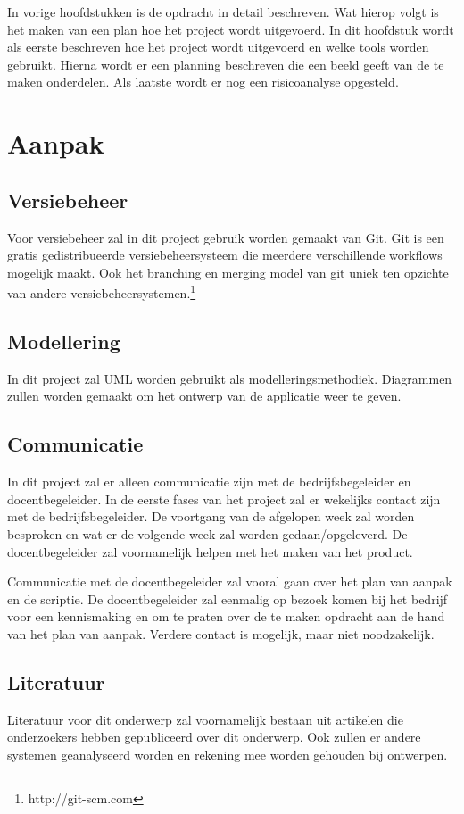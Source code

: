 
In vorige hoofdstukken is de opdracht in detail beschreven. Wat hierop volgt is het maken van een plan hoe het project wordt uitgevoerd. In dit hoofdstuk wordt als eerste beschreven hoe het project wordt uitgevoerd en welke tools worden gebruikt. Hierna wordt er een planning beschreven die een beeld geeft van de te maken onderdelen. Als laatste wordt er nog een risicoanalyse opgesteld.

\section{Aanpak}

\subsection{Versiebeheer}
Voor versiebeheer zal in dit project gebruik worden gemaakt van Git. Git is een gratis gedistribueerde versiebeheersysteem die meerdere verschillende workflows mogelijk maakt. Ook het branching en merging model van git uniek ten opzichte van andere versiebeheersystemen.\footnote{http://git-scm.com}

\subsection{Modellering}
In dit project zal UML worden gebruikt als modelleringsmethodiek. Diagrammen zullen worden gemaakt om het ontwerp van de applicatie weer te geven.

\subsection{Communicatie}
In dit project zal er alleen communicatie zijn met de bedrijfsbegeleider en docentbegeleider. In de eerste fases van het project zal er wekelijks contact zijn met de bedrijfsbegeleider. De voortgang van de afgelopen week zal worden besproken en wat er de volgende week zal worden gedaan/opgeleverd. De docentbegeleider zal voornamelijk helpen met het maken van het product.

Communicatie met de docentbegeleider zal vooral gaan over het plan van aanpak en de scriptie. De docentbegeleider zal eenmalig op bezoek komen bij het bedrijf voor een kennismaking en om te praten over de te maken opdracht aan de hand van het plan van aanpak. Verdere contact is mogelijk, maar niet noodzakelijk.

\subsection{Literatuur}
Literatuur voor dit onderwerp zal voornamelijk bestaan uit artikelen die onderzoekers hebben gepubliceerd over dit onderwerp. Ook zullen er andere systemen geanalyseerd worden en rekening mee worden gehouden bij ontwerpen.

